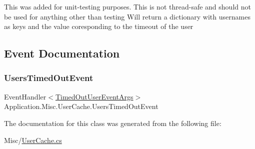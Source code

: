 This was added for unit-\/testing purposes. This is not thread-\/safe and should not be used for anything other than testing Will return a dictionary with usernames as keys and the value coresponding to the timeout of the user 



\subsection{Event Documentation}
\mbox{\label{class_application_1_1_misc_1_1_user_cache_aac04127fb652a14238e2742d0bba6558}} 
\subsubsection{\texorpdfstring{Users\+Timed\+Out\+Event}{UsersTimedOutEvent}}
{\footnotesize\ttfamily Event\+Handler$<$\mbox{\hyperlink{class_application_1_1_interfaces_1_1_timed_out_user_event_args}{Timed\+Out\+User\+Event\+Args}}$>$ Application.\+Misc.\+User\+Cache.\+Users\+Timed\+Out\+Event}



The documentation for this class was generated from the following file\+:\begin{DoxyCompactItemize}
\item 
Misc/\mbox{\hyperlink{_user_cache_8cs}{User\+Cache.\+cs}}\end{DoxyCompactItemize}
